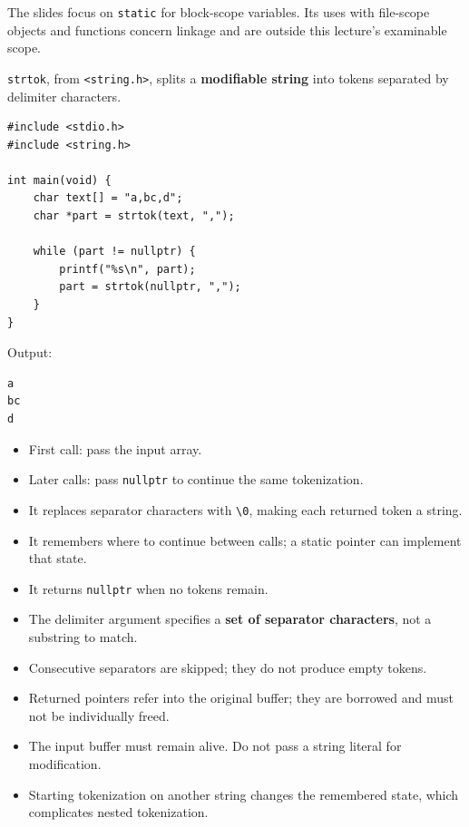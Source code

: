 \documentclass[11pt,a4paper]{article}
\providecommand{\tightlist}{\setlength{\itemsep}{0pt}\setlength{\parskip}{0pt}}
\begin{document}
The slides focus on \texttt{static} for block-scope variables. Its uses with file-scope objects and functions concern linkage and are outside this lecture's examinable scope.

\label{strtok-persistent-state-in-a-library-function}
\hypertarget{strtok-persistent-state-in-a-library-function}{}

\texttt{strtok}, from \texttt{\textless{}string.h\textgreater{}}, splits a \textbf{modifiable string} into tokens separated by delimiter characters.

\begin{lstlisting}[style=cscode]
#include <stdio.h>
#include <string.h>

int main(void) {
    char text[] = "a,bc,d";
    char *part = strtok(text, ",");

    while (part != nullptr) {
        printf("%s\n", part);
        part = strtok(nullptr, ",");
    }
}
\end{lstlisting}

Output:

\begin{lstlisting}[style=plaincode]
a
bc
d
\end{lstlisting}

\begin{itemize}
\tightlist
\item
  First call: pass the input array.
\item
  Later calls: pass \texttt{nullptr} to continue the same tokenization.
\item
  It replaces separator characters with \texttt{\textquotesingle{}\textbackslash{}0\textquotesingle{}}, making each returned token a string.
\item
  It remembers where to continue between calls; a static pointer can implement that state.
\item
  It returns \texttt{nullptr} when no tokens remain.
\item
  The delimiter argument specifies a \textbf{set of separator characters}, not a substring to match.
\item
  Consecutive separators are skipped; they do not produce empty tokens.
\item
  Returned pointers refer into the original buffer; they are borrowed and must not be individually freed.
\item
  The input buffer must remain alive. Do not pass a string literal for modification.
\item
  Starting tokenization on another string changes the remembered state, which complicates nested tokenization.
\end{itemize}
\end{document}
